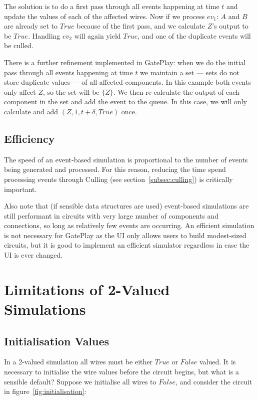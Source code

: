 The solution is to do a first pass through all events happening at time $t$ and update the values of each of the affected wires. Now if we process $ev_1$: $A$ and $B$ are already set to $True$ because of the first pass, and we calculate $Z$'s output to be $True$. Handling $ev_2$ will again yield $True$, and one of the duplicate events will be culled.

There is a further refinement implemented in GatePlay: when we do the initial pass through all events happening at time $t$ we maintain a set --- sets do not store duplicate values --- of all affected components. In this example both events only affect $Z$, so the set will be $\{Z\}$. We then re-calculate the output of each component in the set and add the event to the queue. In this case, we will only calculate and add $(Z, 1, t + \delta, True)$ once.

\subsection{Efficiency}
The speed of an event-based simulation is proportional to the number of events being generated and processed. For this reason, reducing the time spend processing events through Culling (see section~\ref{subsec:culling}) is critically important.

Also note that (if sensible data structures are used) event-based simulations are still performant in circuits with very large number of components and connections, so long as relatively few events are occurring. An efficient simulation is not necessary for GatePlay as the UI only allows users to build modest-sized circuits, but it is good to implement an efficient simulator regardless in case the UI is ever changed.

\section{Limitations of 2-Valued Simulations}
\label{sec:2-valued}

\subsection{Initialisation Values}
\label{subsec:2-valued initialisation}
In a 2-valued simulation all wires must be either $True$ or $False$ valued. It is necessary to initialise the wire values before the circuit begins, but what is a sensible default? Suppose we initialise all wires to $False$, and consider the circuit in figure~\ref{fig:initialisation}:

